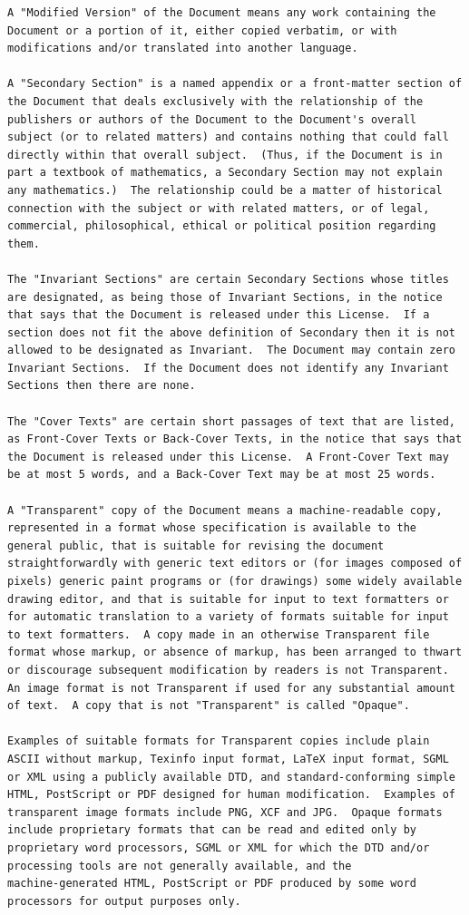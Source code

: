 \documentclass[letterpaper,10pt,english]{sphinxmanual}
\begin{document}
\begin{Verbatim}[commandchars=\\\{\}]
A "Modified Version" of the Document means any work containing the
Document or a portion of it, either copied verbatim, or with
modifications and/or translated into another language.

A "Secondary Section" is a named appendix or a front-matter section of
the Document that deals exclusively with the relationship of the
publishers or authors of the Document to the Document's overall
subject (or to related matters) and contains nothing that could fall
directly within that overall subject.  (Thus, if the Document is in
part a textbook of mathematics, a Secondary Section may not explain
any mathematics.)  The relationship could be a matter of historical
connection with the subject or with related matters, or of legal,
commercial, philosophical, ethical or political position regarding
them.

The "Invariant Sections" are certain Secondary Sections whose titles
are designated, as being those of Invariant Sections, in the notice
that says that the Document is released under this License.  If a
section does not fit the above definition of Secondary then it is not
allowed to be designated as Invariant.  The Document may contain zero
Invariant Sections.  If the Document does not identify any Invariant
Sections then there are none.

The "Cover Texts" are certain short passages of text that are listed,
as Front-Cover Texts or Back-Cover Texts, in the notice that says that
the Document is released under this License.  A Front-Cover Text may
be at most 5 words, and a Back-Cover Text may be at most 25 words.

A "Transparent" copy of the Document means a machine-readable copy,
represented in a format whose specification is available to the
general public, that is suitable for revising the document
straightforwardly with generic text editors or (for images composed of
pixels) generic paint programs or (for drawings) some widely available
drawing editor, and that is suitable for input to text formatters or
for automatic translation to a variety of formats suitable for input
to text formatters.  A copy made in an otherwise Transparent file
format whose markup, or absence of markup, has been arranged to thwart
or discourage subsequent modification by readers is not Transparent.
An image format is not Transparent if used for any substantial amount
of text.  A copy that is not "Transparent" is called "Opaque".

Examples of suitable formats for Transparent copies include plain
ASCII without markup, Texinfo input format, LaTeX input format, SGML
or XML using a publicly available DTD, and standard-conforming simple
HTML, PostScript or PDF designed for human modification.  Examples of
transparent image formats include PNG, XCF and JPG.  Opaque formats
include proprietary formats that can be read and edited only by
proprietary word processors, SGML or XML for which the DTD and/or
processing tools are not generally available, and the
machine-generated HTML, PostScript or PDF produced by some word
processors for output purposes only.


\end{Verbatim}
\end{document}
